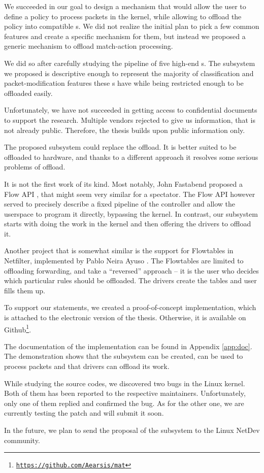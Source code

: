 

We succeeded in our goal to design a mechanism that would allow the user to
define a policy to process packets in the kernel, while allowing to offload the
policy into compatible s. We did not realize the initial plan to pick
a few common features and create a specific mechanism for them, but instead we
proposed a generic mechanism to offload match-action processing.

We did so after carefully studying the pipeline of five high-end s.
The subsystem we proposed is descriptive enough to represent the majority of
classification and packet-modification features these s have while
being restricted enough to be offloaded easily.

Unfortunately, we have not succeeded in getting access to confidential
documents to support the research. Multiple vendors rejected to give us
information, that is not already public. Therefore, the thesis builds upon
public information only.

The proposed subsystem could replace the  offload. It is better suited to be
offloaded to hardware, and thanks to a different approach it resolves some
serious problems of  offload.

It is not the first work of its kind. Most notably, John Fastabend proposed
a Flow API \cite{flow-api}, that might seem very similar for a spectator. The
Flow API however served to precisely describe a fixed pipeline of the
controller and allow the userspace to program it directly, bypassing the
kernel. In contrast, our subsystem starts with doing the work in the kernel and
then offering the drivers to offload it.

Another project that is somewhat similar is the support for Flowtables in
Netfilter, implemented by Pablo Neira Ayuso \cite{flowtables}. The Flowtables
are limited to offloading forwarding, and take a ``reversed'' approach -- it is
the user who decides which particular rules should be offloaded. The drivers
create the tables and user fills them up.

To support our statements, we created a proof-of-concept implementation, which
is attached to the electronic version of the thesis. Otherwise, it is available
on Github\footnote{\href{https://github.com/Aearsis/mat}{\texttt{https://github.com/Aearsis/mat}}}.

The documentation of the implementation can be found in Appendix
\ref{app:doc}. The demonstration shows that the subsystem can be created, can
be used to process packets and that drivers can offload its work.

While studying the source codes, we discovered two bugs in the Linux kernel.
Both of them has been reported to the respective maintainers. Unfortunately,
only one of them replied and confirmed the bug. As for the other one, we are
currently testing the patch and will submit it soon.

In the future, we plan to send the proposal of the subsystem to the Linux
NetDev community.
